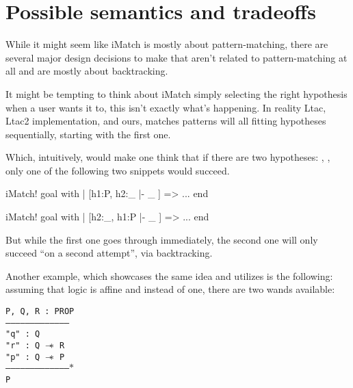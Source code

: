 \section{Possible semantics and tradeoffs}

While it might seem like iMatch is mostly about pattern-matching, there are several major design decisions to make that aren't related to pattern-matching at all and are mostly about backtracking.

It might be tempting to think about iMatch simply selecting the right hypothesis when a user wants it to, this isn't exactly what's happening.
In reality Ltac, Ltac2 implementation, and ours, matches patterns will all fitting hypotheses sequentially, starting with the first one.

Which, intuitively, would make one think that if there are two hypotheses: , , only one of the following two snippets would succeed.
\begin{coq}
  iMatch! goal with
  | [h1:P, h2:_ |- _ ] => ...
  end
\end{coq}
\begin{coq}
  iMatch! goal with
  | [h2:_, h1:P |- _ ] => ...
  end
\end{coq}

But while the first one goes through immediately, the second one will only succeed ``on a second attempt'', via backtracking.


Another example, which showcases the same idea and utilizes  is the following: assuming that logic is affine and instead of one, there are two wands available:\\
\begin{minipage}{\linewidth}
\texttt{P, Q, R : PROP\\
---------------------------------------\\
"q" : Q\\
"r" : Q $\mathrel{-\mkern-6mu*}$ R\\
"p" : Q $\mathrel{-\mkern-6mu*}$ P\\
--------------------------------------$\ast$\\
P
}
\end{minipage}

